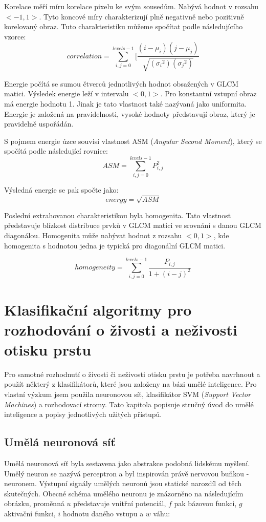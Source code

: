 Korelace měří míru korelace pixelu ke svým sousedům. Nabývá hodnot v rozsahu $<-1, 1>$. Tyto koncové míry charakterizují plně negativně nebo pozitivně korelovaný obraz. \cite{MatlabGLCM} Tuto charakteristiku můžeme spočítat podle následujícího vzorce: \cite{ScikitGLCM}
$$correlation = \sum_{i,j=0}^{levels-1}[\frac{(i-\mu_i)(j-\mu_j)}{\sqrt{({\sigma_i}^2)({\sigma_j}^2)}}$$

Energie počítá se sumou čtverců jednotlivých hodnot obsažených v GLCM matici. Výsledek energie leží v intervalu $<0, 1>$. Pro konstantní vstupní obraz má energie hodnotu 1. Jinak je tato vlastnost také nazývaná jako uniformita. Energie je založená na pravidelnosti, vysoké hodnoty představují obraz, který je pravidelně uspořádán. \cite{MatlabGLCM}

S pojmem energie úzce souvisí vlastnost ASM (\textit{Angular Second Moment}), který se spočítá podle následující rovnice: \cite{ScikitGLCM}
$$ASM = \sum_{i,j=0}^{levels-1}P_{i,j}^2$$

Výsledná energie se pak spočte jako: \cite{ScikitGLCM}
$$energy = \sqrt{ASM}$$

Poslední extrahovanou charakteristikou byla homogenita. Tato vlastnost představuje blízkost distribuce prvků v GLCM matici ve srovnání s danou GLCM diagonálou. Homogenita může nabývat hodnot z rozsahu $<0, 1>$, kde homogenita s hodnotou jedna je typická pro diagonální GLCM matici. \cite{MatlabGLCM} \cite{ScikitGLCM}

$$homogeneity = \sum_{i,j=0}^{levels-1}\frac{P_{i,j}}{1+(i-j)^2}$$


\chapter{Klasifikační algoritmy pro rozhodování o živosti a neživosti otisku prstu}
Pro samotné rozhodnutí o živosti či neživosti otisku prstu je potřeba navrhnout a použít některý z klasifikátorů, které jsou založeny na bázi umělé inteligence. Pro vlastní výzkum jsem použila neuronovou síť, klasifikátor SVM (\textit{Support Vector Machines}) a rozhodovací stromy. Tato kapitola popisuje stručný úvod do umělé inteligence a popisy jednotlivých užitých přístupů.

\section{Umělá neuronová síť}
Umělá neuronová síť byla sestavena jako abstrakce podobná lidskému myšlení. Umělý neuron se nazývá perceptron a byl inspirován právě nervovou buňkou - neuronem. Výstupní signály umělých neuronů jsou statické narozdíl od těch skutečných. Obecné schéma umělého neuronu je znázorněno na následujícím obrázku, proměnná $u$ představuje vnitřní potenciál, $f$ pak bázovou funkci, $g$ aktivační funkci, $i$ hodnotu daného vstupu a $w$ váhu:

